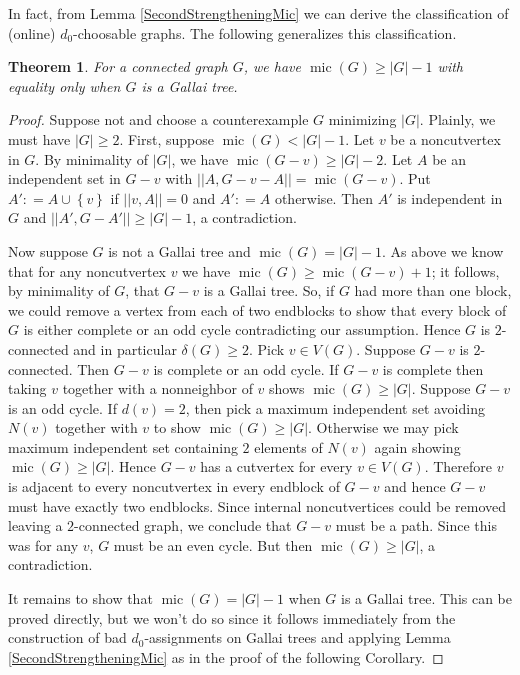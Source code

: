 \documentclass[12pt]{article}
\theoremstyle{plain}
\newtheorem{thm}{Theorem}[section]
\theoremstyle{definition}
\theoremstyle{remark}
\newcommand{\set}[1]{\left\{ #1 \right\}}
\newcommand{\DefinedAs}{\mathrel{\mathop:}=}
\newcommand{\mic}{\operatorname{mic}}
\begin{document}
In fact, from Lemma \ref{SecondStrengtheningMic} we can derive the classification of (online) $d_0$-choosable graphs.  The following generalizes this classification.

\begin{thm}\label{micBasics}
For a connected graph $G$, we have $\mic(G) \ge |G| - 1$ with equality only when $G$ is a Gallai tree.
\end{thm}
\begin{proof}
Suppose not and choose a counterexample $G$ minimizing $|G|$.  Plainly, we must have $|G| \ge 2$. First, suppose $\mic(G) < |G| - 1$.  Let $v$ be a noncutvertex in $G$.  By minimality of $|G|$, we have $\mic(G-v) \ge |G|-2$.  Let $A$ be an independent set in $G-v$ with $||A, G-v-A|| = \mic(G-v)$.  Put $A' \DefinedAs A \cup \set{v}$ if $||v, A|| = 0$ and $A' \DefinedAs A$ otherwise.  Then $A'$ is independent in $G$ and $||A', G-A'|| \ge |G|-1$, a contradiction.

Now suppose $G$ is not a Gallai tree and $\mic(G) = |G| - 1$.  As above we know that for any noncutvertex $v$ we have $\mic(G) \ge \mic(G-v) + 1$; it follows, by minimality of $G$, that $G-v$ is a Gallai tree.  So,
if $G$ had more than one block, we could remove a vertex from each of two endblocks to show that every block of $G$ is either complete or an odd cycle contradicting our assumption.  Hence $G$ is $2$-connected and in particular $\delta(G) \ge 2$.  Pick $v \in V(G)$.  Suppose $G-v$ is $2$-connected.  Then $G-v$ is complete or an odd cycle.  If $G-v$ is complete then taking $v$ together with a nonneighbor of $v$ shows $\mic(G) \ge |G|$.  Suppose $G-v$ is an odd cycle.  If $d(v) = 2$, then pick a maximum independent set avoiding $N(v)$ together with $v$ to show $\mic(G) \ge |G|$.  Otherwise we may pick maximum independent set containing $2$ elements of $N(v)$ again showing $\mic(G) \ge |G|$.  Hence $G-v$ has a cutvertex for every $v \in V(G)$.  Therefore $v$ is adjacent to every noncutvertex in every endblock of $G-v$ and hence $G-v$ must have exactly two endblocks.  Since internal noncutvertices could be removed leaving a $2$-connected graph, we conclude that $G-v$ must be a path.  Since this was for any $v$, $G$ must be an even cycle.  But then $\mic(G) \ge |G|$, a contradiction.

It remains to show that $\mic(G) = |G| - 1$ when $G$ is a Gallai tree.  This can be proved directly, but we won't do so since it follows immediately from the construction of bad $d_0$-assignments on Gallai trees and applying Lemma \ref{SecondStrengtheningMic} as in the proof of the following Corollary.
\end{proof}
\end{document}
